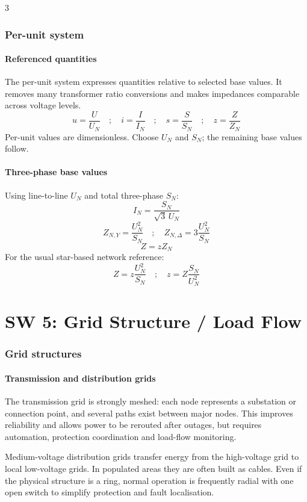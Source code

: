 \documentclass[9pt, landscape, a4paper]{article}
\begin{document}
\begin{multicols*}{3}
\section{Per-unit system}
\subsection{Referenced quantities}
The per-unit system expresses quantities relative to selected base values. It
removes many transformer ratio conversions and makes impedances comparable
across voltage levels.
\[
  u=\frac{U}{U_N}
  \quad ; \quad
  i=\frac{I}{I_N}
  \quad ; \quad
  s=\frac{S}{S_N}
  \quad ; \quad
  z=\frac{Z}{Z_N}
\]
Per-unit values are dimensionless. Choose $U_N$ and $S_N$; the remaining base
values follow.

\subsection{Three-phase base values}
Using line-to-line $U_N$ and total three-phase $S_N$:
\[
  I_N=\frac{S_N}{\sqrt3\,U_N}
\]
\[
  Z_{N,Y}=\frac{U_N^2}{S_N}
  \quad ; \quad
  Z_{N,\Delta}=3\frac{U_N^2}{S_N}
\]
\[
  Z=zZ_N
\]
For the usual star-based network reference:
\[
  Z=z\frac{U_N^2}{S_N}
  \quad ; \quad
  z=Z\frac{S_N}{U_N^2}
\]

\part{SW 5: Grid Structure / Load Flow}
\section{Grid structures}
\subsection{Transmission and distribution grids}
The transmission grid is strongly meshed: each node represents a substation or
connection point, and several paths exist between major nodes. This improves
reliability and allows power to be rerouted after outages, but requires
automation, protection coordination and load-flow monitoring.

Medium-voltage distribution grids transfer energy from the high-voltage grid to
local low-voltage grids. In populated areas they are often built as cables.
Even if the physical structure is a ring, normal operation is frequently radial
with one open switch to simplify protection and fault localisation.


\end{multicols*}
\end{document}
